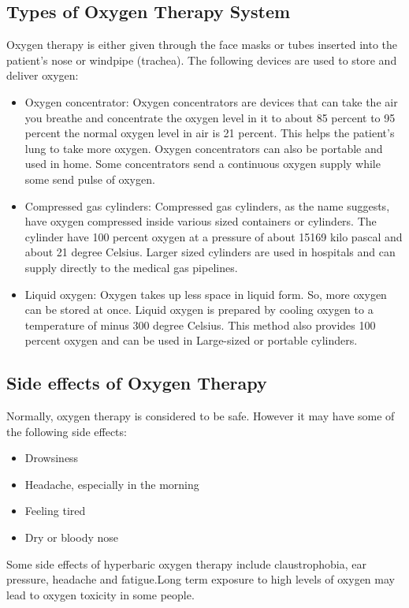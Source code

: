 \documentclass[12pt]{article}
\begin{document}
\subsection{Types of Oxygen Therapy System}
Oxygen therapy is either given through the face masks or tubes inserted into the patient's nose  or windpipe (trachea). The following devices are used to store and deliver oxygen:
\begin{itemize}
\item Oxygen concentrator: Oxygen concentrators are devices that can take the air you breathe and concentrate the oxygen level in it to about 85 percent to 95 percent the normal oxygen level in air is 21 percent. This helps the patient's lung to take more oxygen. Oxygen concentrators can also be portable and used in home. Some concentrators send a continuous oxygen supply while some send pulse of oxygen.

\item Compressed gas cylinders: Compressed gas cylinders, as the name suggests, have oxygen compressed inside various sized containers or cylinders. The cylinder have 100 percent oxygen at a pressure of about 15169 kilo pascal and about 21 degree Celsius. Larger sized cylinders are used in hospitals and can supply directly to the medical gas pipelines. 
 
 \item Liquid oxygen: Oxygen takes up less space in liquid form. So, more oxygen can be stored at once. Liquid oxygen is prepared by cooling oxygen to a temperature of minus 300 degree Celsius. This method also provides 100 percent oxygen and can be used in Large-sized or portable cylinders.  
\end{itemize} 

\subsection{Side effects of Oxygen Therapy}
Normally, oxygen therapy is considered to be safe. However it may have some of the following side effects:
\begin{itemize}
\item Drowsiness
\item Headache, especially in the morning 
\item Feeling tired
\item Dry or bloody nose
\end{itemize}
Some side effects of hyperbaric oxygen therapy include claustrophobia, ear pressure, headache and fatigue.Long term exposure to high levels of oxygen may lead to oxygen toxicity in some people. 
\end{document}
